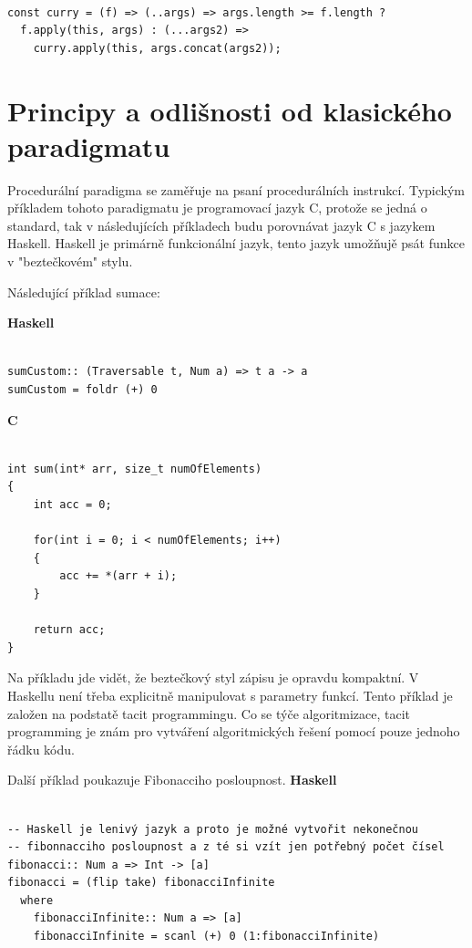 \documentclass[male,czech]{kithesis}
\begin{document}
\begin{verbatim}

const curry = (f) => (..args) => args.length >= f.length ? 
  f.apply(this, args) : (...args2) => 
    curry.apply(this, args.concat(args2));

\end{verbatim}
\section{Principy a odlišnosti od klasického paradigmatu}

Procedurální paradigma se zaměřuje na psaní procedurálních instrukcí.
Typickým příkladem tohoto paradigmatu je programovací jazyk C, 
protože se jedná o standard, 
tak v následujících příkladech budu porovnávat jazyk C s jazykem Haskell.
Haskell je primárně funkcionální jazyk, 
tento jazyk umožňujě psát funkce v "beztečkovém" stylu. 

Následující příklad sumace:

\textbf{Haskell}
\begin{verbatim}

sumCustom:: (Traversable t, Num a) => t a -> a
sumCustom = foldr (+) 0

\end{verbatim}

\textbf{C}
\begin{verbatim}

int sum(int* arr, size_t numOfElements)
{
    int acc = 0;
    
    for(int i = 0; i < numOfElements; i++)
    {
        acc += *(arr + i);
    }
    
    return acc;
}

\end{verbatim}
Na příkladu jde vidět, 
že beztečkový styl zápisu je opravdu kompaktní. 
V Haskellu není třeba explicitně manipulovat s parametry funkcí.
Tento příklad je založen na podstatě tacit programmingu.
Co se týče algoritmizace, 
tacit programming je znám pro vytváření algoritmických řešení pomocí pouze jednoho řádku kódu. 

Další příklad poukazuje Fibonacciho posloupnost.
\textbf{Haskell}
\begin{verbatim}

-- Haskell je lenivý jazyk a proto je možné vytvořit nekonečnou 
-- fibonnacciho posloupnost a z té si vzít jen potřebný počet čísel 
fibonacci:: Num a => Int -> [a]
fibonacci = (flip take) fibonacciInfinite
  where
    fibonacciInfinite:: Num a => [a]
    fibonacciInfinite = scanl (+) 0 (1:fibonacciInfinite)

\end{verbatim}
\end{document}
